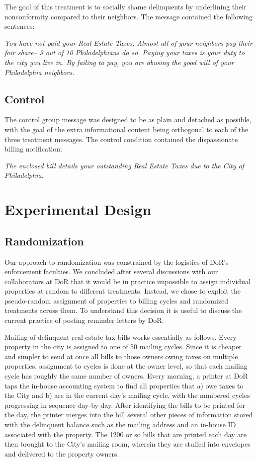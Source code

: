 \documentclass[12pt,titlepage]{article}
\begin{document}
The goal of this treatment is to socially shame delinquents by
underlining their nonconformity compared to their neighbors.  The
message contained the following sentences:

{\it You have not paid your Real Estate Taxes. Almost all of your
  neighbors pay their fair share-- 9 out of 10 Philadelphians do
  so. Paying your taxes is your duty to the city you live in. By
  failing to pay, you are abusing the good will of your Philadelphia
  neighbors.}

\subsection{Control}

The control group message was designed to be as plain and detached as
possible, with the goal of the extra informational content being orthogonal
to each of the three treatment messages.  The control condition
contained the dispassionate billing notification:

{\it The enclosed bill details your outstanding Real Estate Taxes due
  to the City of Philadelphia.}

\section{Experimental Design}

\subsection{Randomization}

Our approach to randomization was constrained by the logistics of
DoR's enforcement faculties. We concluded after several discussions
with our collaborators at DoR that it would be in practice impossible
to assign individual properties at random to different treatments. Instead, we
chose to exploit the pseudo-random assignment of properties to billing
cycles and randomized treatments across them.  To understand
this decision it is useful to discuss the current practice of 
posting reminder letters by DoR.

Mailing of delinquent real estate tax bills works essentially as
follows.  Every property in the city is assigned to one of 50 mailing
cycles. Since it is cheaper and simpler to send at once all bills to
those owners owing taxes on multiple properties, assignment to cycles
is done at the owner level, so that each mailing cycle has roughly the
same number of owners.  Every morning, a printer at DoR taps the
in-house accounting system to find all properties that a) owe taxes to
the City and b) are in the current day's mailing cycle, with the
numbered cycles progressing in sequence day-by-day.
After identifying the bills to be printed for the day,
the printer merges into the bill several other pieces of information
stored with the delinquent balance such as the mailing address and an
in-house ID associated with the property. The 1200 or so bills that
are printed each day are then brought to the City's mailing room,
wherein they are stuffed into envelopes and delivered to the property
owners.
\end{document}

